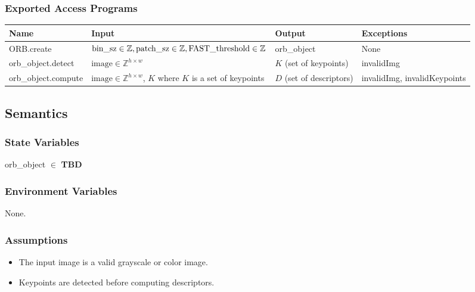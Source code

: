 \documentclass[12pt, titlepage]{article}
\begin{document}
\subsubsection{Exported Access Programs}

\begin{center}
\begin{tabular}{p{3.5cm} p{6cm} p{4.5cm} p{2cm}}
\hline
\textbf{Name} & \textbf{Input} & \textbf{Output} & \textbf{Exceptions} \\
\hline
ORB.create & $\text{bin\_sz}\in \mathbb{Z}, \newline 
\text{patch\_sz}\in \mathbb{Z}, \newline 
\text{FAST\_threshold} \in \mathbb{Z}$ & orb\_object & None \\
\hline
orb\_object.detect & $\text{image} \in \mathbb{Z}^{h \times w}$ & $K$ (set of keypoints) & invalidImg \\
\hline
orb\_object.compute & $\text{image} \in \mathbb{Z}^{h \times w}$, \newline 
$K$ where $K$ is a set of keypoints & $D$ (set of descriptors) & invalidImg, invalidKeypoints \\
\hline
\end{tabular}
\end{center}

\subsection{Semantics}

\subsubsection{State Variables}
orb\_object $\in$ \textbf{TBD}

\subsubsection{Environment Variables}
None.

\subsubsection{Assumptions}
\begin{itemize}
    \item The input image is a valid grayscale or color image.
    \item Keypoints are detected before computing descriptors.
\end{itemize}
\end{document}
